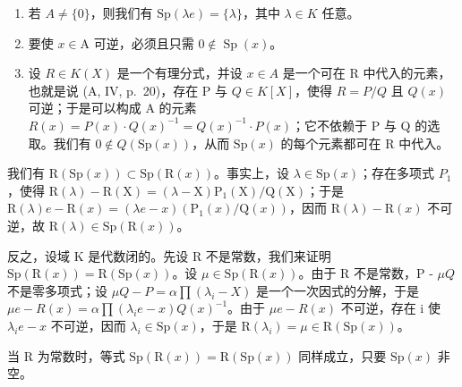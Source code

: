 \begin{enumerate}
\def\labelenumi{\arabic{enumi})}
\setcounter{enumi}{1}
\item
  若 \(A \neq \{0\}\)，则我们有 \(\mathrm{Sp}(\lambda e) = \{\lambda\}\)，其中 \(\lambda \in K\) 任意。
\item
  要使 \(x \in \mathrm{A}\) 可逆，必须且只需 \(0 \notin \operatorname{Sp}(x)\)。
\item
  设 \(R \in K(X)\) 是一个有理分式，并设 \(x \in A\) 是一个可在 R 中代入的元素，也就是说 (A, IV, p.~20)，存在 P 与 \(Q \in K[X]\)，使得 \(R = P/Q\) 且 \(Q(x)\) 可逆；于是可以构成 A 的元素 \(R(x) = P(x) \cdot Q(x)^{-1} = Q(x)^{-1} \cdot P(x)\)；它不依赖于 P 与 Q 的选取。我们有 \(0 \notin Q(\mathrm{Sp}(x))\)，从而 \(\mathrm{Sp}(x)\) 的每个元素都可在 R 中代入。
\end{enumerate}

我们有 \(\mathrm{R}(\mathrm{Sp}(x)) \subset \mathrm{Sp}(\mathrm{R}(x))\)。事实上，设 \(\lambda \in \mathrm{Sp}(x)\)；存在多项式 \(P_{1}\)，使得 \(\mathrm{R}(\lambda) - \mathrm{R}(\mathrm{X}) = (\lambda - \mathrm{X})\mathrm{P}_{1}(\mathrm{X}) / \mathrm{Q}(\mathrm{X})\)；于是 \(\mathrm{R}(\lambda)e - \mathrm{R}(x) = (\lambda e - x)(\mathrm{P}_{1}(x)/\mathrm{Q}(x))\)，因而 \(\mathrm{R}(\lambda) - \mathrm{R}(x)\) 不可逆，故 \(\mathrm{R}(\lambda) \in \mathrm{Sp}(\mathrm{R}(x))\)。

反之，设域 K 是代数闭的。先设 R 不是常数，我们来证明 \(\mathrm{Sp}(\mathrm{R}(x)) = \mathrm{R}(\mathrm{Sp}(x))\)。设 \(\mu \in \mathrm{Sp}(\mathrm{R}(x))\)。由于 R 不是常数，P - \(\mu Q\) 不是零多项式；设 \(\mu Q - P = \alpha \prod (\lambda_i - X)\) 是一个一次因式的分解，于是 \(\mu e - R(x) = \alpha \prod (\lambda_i e - x) Q(x)^{-1}\)。由于 \(\mu e - R(x)\) 不可逆，存在 i 使 \(\lambda_i e - x\) 不可逆，因而 \(\lambda_i \in \mathrm{Sp}(x)\)，于是 \(\mathrm{R}(\lambda_i) = \mu \in \mathrm{R}(\mathrm{Sp}(x))\)。

当 R 为常数时，等式 \(\mathrm{Sp}(\mathrm{R}(x)) = \mathrm{R}(\mathrm{Sp}(x))\) 同样成立，只要 \(\mathrm{Sp}(x)\) 非空。

